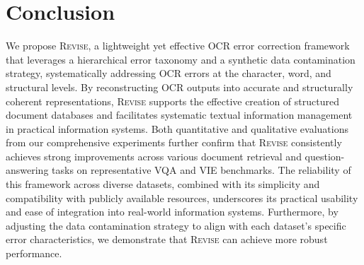 \section{Conclusion}


We propose \textsc{Revise}, a lightweight yet effective OCR error correction framework that leverages a hierarchical error taxonomy and a synthetic data contamination strategy, systematically addressing OCR errors at the character, word, and structural levels. By reconstructing OCR outputs into accurate and structurally coherent representations, \textsc{Revise} supports the effective creation of structured document databases and facilitates systematic textual information management in practical information systems. Both quantitative and qualitative evaluations from our comprehensive experiments further confirm that \textsc{Revise} consistently achieves strong improvements across various document retrieval and question-answering tasks on representative VQA and VIE benchmarks. The reliability of this framework across diverse datasets, combined with its simplicity and compatibility with publicly available resources, underscores its practical usability and ease of integration into real-world information systems. Furthermore, by adjusting the data contamination strategy to align with each dataset's specific error characteristics, we demonstrate that \textsc{Revise} can achieve more robust performance.